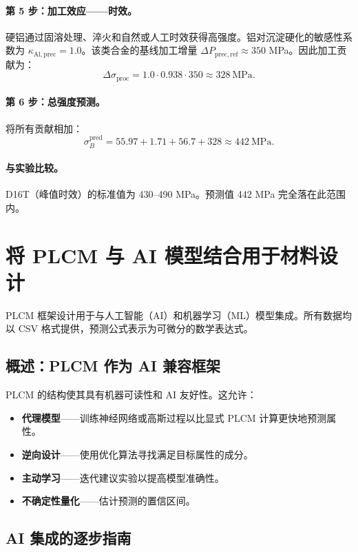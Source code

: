 \documentclass[12pt,a4paper]{article}
\begin{document}
	\paragraph{第 5 步：加工效应——时效。}
	硬铝通过固溶处理、淬火和自然或人工时效获得高强度。铝对沉淀硬化的敏感性系数为 \(\kappa_{\mathrm{Al,prec}}=1.0\)。该类合金的基线加工增量 \(\Delta P_{\mathrm{prec,ref}}\approx 350\) MPa。因此加工贡献为：
	\[
	\Delta\sigma_{\mathrm{proc}} = 1.0\cdot0.938\cdot350 \approx 328\ \text{MPa}.
	\]
	
	\paragraph{第 6 步：总强度预测。}
	将所有贡献相加：
	\[
	\sigma_B^{\mathrm{pred}} = 55.97 + 1.71 + 56.7 + 328 \approx 442\ \text{MPa}.
	\]
	
	\paragraph{与实验比较。}
	D16T（峰值时效）的标准值为 430–490 MPa。预测值 442 MPa 完全落在此范围内。
	
	\section{将 PLCM 与 AI 模型结合用于材料设计}
	\label{sec:ai-integration}
	
	PLCM 框架设计用于与人工智能（AI）和机器学习（ML）模型集成。所有数据均以 CSV 格式提供，预测公式表示为可微分的数学表达式。
	
	\subsection{概述：PLCM 作为 AI 兼容框架}
	
	PLCM 的结构使其具有机器可读性和 AI 友好性。这允许：
	\begin{itemize}
		\item \textbf{代理模型}——训练神经网络或高斯过程以比显式 PLCM 计算更快地预测属性。
		\item \textbf{逆向设计}——使用优化算法寻找满足目标属性的成分。
		\item \textbf{主动学习}——迭代建议实验以提高模型准确性。
		\item \textbf{不确定性量化}——估计预测的置信区间。
	\end{itemize}
	
	\subsection{AI 集成的逐步指南}
	
\end{document}
